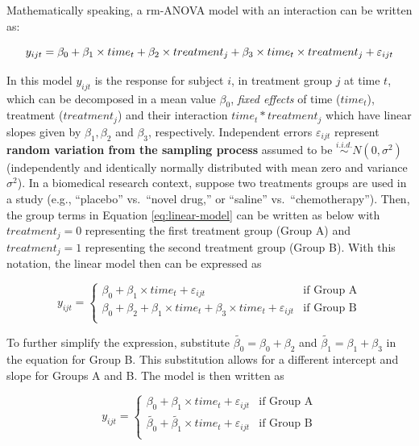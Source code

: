 \documentclass[
]{article}
\begin{document}
Mathematically speaking, a rm-ANOVA model with an interaction can be written as:

\begin{equation}
y_{ijt} = \beta_0+\beta_1 \times time_{t} +\beta_2 \times treatment_{j} +\beta_3 \times time_{t}\times treatment_{j}+\varepsilon_{ijt}\\ 
\label{eq:linear-model}
\end{equation}

In this model \(y_{ijt}\) is the response for subject \(i\), in treatment group \(j\) at time \(t\), which can be decomposed in a mean value \(\beta_0\), \emph{fixed effects} of time (\(time_t\)), treatment (\(treatment_j\)) and their interaction \(time_t*treatment_j\) which have linear slopes given by \(\beta_1, \beta_2\) and \(\beta_3\), respectively. Independent errors \(\varepsilon_{ijt}\) represent \textbf{random variation from the sampling process } assumed to be \(\stackrel{i.i.d.}\sim N(0,\sigma^2)\) (independently and identically normally distributed with mean zero and variance \(\sigma^2\)).
In a biomedical research context, suppose two treatments groups are used in a study (e.g., ``placebo'' vs.~``novel drug,'' or ``saline'' vs.~``chemotherapy''). Then, the group terms in Equation \eqref{eq:linear-model} can be written as below with \(treatment_j=0\) representing the first treatment group (Group A) and \(treatment_j=1\) representing the second treatment group (Group B). With this notation, the linear model then can be expressed as

\begin{equation}
y_{ijt} = \begin{cases}
\beta_0 + \beta_1\times time_{t}+\varepsilon_{ijt}   & \mbox{if Group A}\\
\beta_0 + \beta_2+\beta_1 \times time_{t} +\beta_3 \times time_{t}+\varepsilon_{ijt}  & \mbox{if Group B}\\
\end{cases}
\label{eq:ANOVA-by-group}
\end{equation}

To further simplify the expression, substitute \(\widetilde{\beta_{0}}=\beta_0+\beta_{2}\) and \(\widetilde{\beta_{1}}=\beta_{1}+\beta_{3}\) in the equation for Group B. This substitution allows for a different intercept and slope for Groups A and B. The model is then written as

\begin{equation}
y_{ijt} = \begin{cases}
\beta_0 + \beta_1\times time_{t}+\varepsilon_{ijt}   & \mbox{if Group A}\\
\widetilde{\beta_{0}} + \widetilde{\beta_1} \times time_{t}+\varepsilon_{ijt}  & \mbox{if Group B}\\
\end{cases}
\label{eq:ANOVA-lines}
\end{equation}
\end{document}
